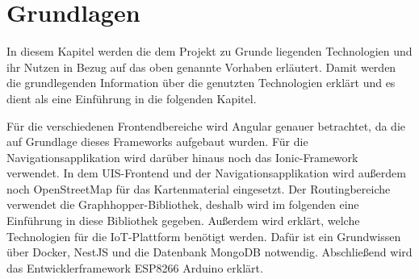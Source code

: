 \chapter{Grundlagen}
In diesem Kapitel werden die dem Projekt zu Grunde liegenden Technologien und ihr Nutzen in Bezug auf das oben genannte Vorhaben erläutert. 
Damit werden die grundlegenden Information über die genutzten Technologien erklärt und es dient als eine Einführung in die folgenden Kapitel. 

Für die verschiedenen Frontendbereiche wird Angular genauer betrachtet, da die auf Grundlage dieses Frameworks aufgebaut wurden.
Für die Navigationsapplikation wird darüber hinaus noch das Ionic-Framework verwendet. 
In dem UIS-Frontend und der Navigationsapplikation wird außerdem noch OpenStreetMap für das Kartenmaterial eingesetzt. 
Der Routingbereiche verwendet die Graphhopper-Bibliothek, deshalb wird im folgenden eine Einführung in diese Bibliothek gegeben. 
Außerdem wird erklärt, welche Technologien für die IoT-Plattform benötigt werden. 
Dafür ist ein Grundwissen über Docker, NestJS und die Datenbank MongoDB notwendig. 
Abschließend wird das Entwicklerframework ESP8266 Arduino erklärt. 




















